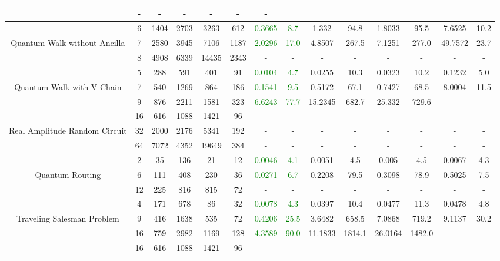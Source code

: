 \begin{table}[htb]
{\begin{tabular}{|c|c|c|c|c|c|c|c|c|c|c|c|c|c|}
 & - & -
 & - & -
 & - & -
 \\
\hline
 & 
6 & 1404 & 2703 & 3263 & 612
 & \textcolor{green}{0.3665} & \textcolor{green}{8.7}
 & 1.332 & 94.8
 & 1.8033 & 95.5
 & 7.6525 & 10.2
 \\
Quantum Walk without Ancilla & 
7 & 2580 & 3945 & 7106 & 1187
 & \textcolor{green}{2.0296} & \textcolor{green}{17.0}
 & 4.8507 & 267.5
 & 7.1251 & 277.0
 & 49.7572 & 23.7
 \\
 & 
8 & 4908 & 6339 & 14435 & 2343
 & - & -
 & - & -
 & - & -
 & - & -
 \\
\hline
 & 
5 & 288 & 591 & 401 & 91
 & \textcolor{green}{0.0104} & \textcolor{green}{4.7}
 & 0.0255 & 10.3
 & 0.0323 & 10.2
 & 0.1232 & 5.0
 \\
Quantum Walk with V-Chain & 
7 & 540 & 1269 & 864 & 186
 & \textcolor{green}{0.1541} & \textcolor{green}{9.5}
 & 0.5172 & 67.1
 & 0.7427 & 68.5
 & 8.0004 & 11.5
 \\
 & 
9 & 876 & 2211 & 1581 & 323
 & \textcolor{green}{6.6243} & \textcolor{green}{77.7}
 & 15.2345 & 682.7
 & 25.332 & 729.6
 & - & -
 \\
\hline
 & 
16 & 616 & 1088 & 1421 & 96
 & - & -
 & - & -
 & - & -
 & - & -
 \\
Real Amplitude Random Circuit & 
32 & 2000 & 2176 & 5341 & 192
 & - & -
 & - & -
 & - & -
 & - & -
 \\
 & 
64 & 7072 & 4352 & 19649 & 384
 & - & -
 & - & -
 & - & -
 & - & -
 \\
\hline
 & 
2 & 35 & 136 & 21 & 12
 & \textcolor{green}{0.0046} & \textcolor{green}{4.1}
 & 0.0051 & 4.5
 & 0.005 & 4.5
 & 0.0067 & 4.3
 \\
Quantum Routing & 
6 & 111 & 408 & 230 & 36
 & \textcolor{green}{0.0271} & \textcolor{green}{6.7}
 & 0.2208 & 79.5
 & 0.3098 & 78.9
 & 0.5025 & 7.5
 \\
 & 
12 & 225 & 816 & 815 & 72
 & - & -
 & - & -
 & - & -
 & - & -
 \\
\hline
 & 
4 & 171 & 678 & 86 & 32
 & \textcolor{green}{0.0078} & \textcolor{green}{4.3}
 & 0.0397 & 10.4
 & 0.0477 & 11.3
 & 0.0478 & 4.8
 \\
Traveling Salesman Problem & 
9 & 416 & 1638 & 535 & 72
 & \textcolor{green}{0.4206} & \textcolor{green}{25.5}
 & 3.6482 & 658.5
 & 7.0868 & 719.2
 & 9.1137 & 30.2
 \\
 & 
16 & 759 & 2982 & 1169 & 128
 & \textcolor{green}{4.3589} & \textcolor{green}{90.0}
 & 11.1833 & 1814.1
 & 26.0164 & 1482.0
 & - & -
 \\
\hline
 & 
16 & 616 & 1088 & 1421 & 96

\end{tabular}}
\end{table}
